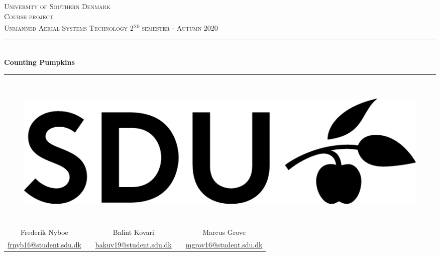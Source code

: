 \documentclass[../Head/Main.tex]{subfiles}
\begin{document}
\begin{titlepage}
\begin{center}
\textsc{\LARGE University of Southern Denmark}\\[1.25cm]

\textsc{Course project}\\[0.35cm]

\textsc{\large Unmanned Aerial Systems Technology 2\textsuperscript{nd} semester - Autumn 2020}\\[0.35cm]
\rule{\linewidth}{0.5mm}\\[0.35cm]
{ \LARGE \bfseries Counting Pumpkins\\[0.35cm]}
\rule{\linewidth}{0.5mm}\\[1cm]

\vspace{3cm}

    \begin{figure}[h!]
    \centering
    \includegraphics[scale=1]{../Figures/SDUlogo}
    \label{fig:SDUlogo}\\
    [2.5cm]
    \end{figure}

\begin{tabular}{c c c c c}
    \\
    \\
    \\
    \\
    \\
    \\    
    \cline{1-1}\cline{3-3}\cline{5-5}
    Frederik Nyboe & & Balint Kovari & & Marcus Grove \\
    \href{mailto:frnyb16@student.sdu.dk}{frnyb16@student.sdu.dk} & & \href{mailto:bakuv19@student.sdu.dk}{bakuv19@student.sdu.dk} & &
    \href{mailto:mgrov16@student.sdu.dk}{mgrov16@student.sdu.dk}
    \\
\end{tabular}	

\vfill


\end{center}
\end{titlepage}
\end{document}
